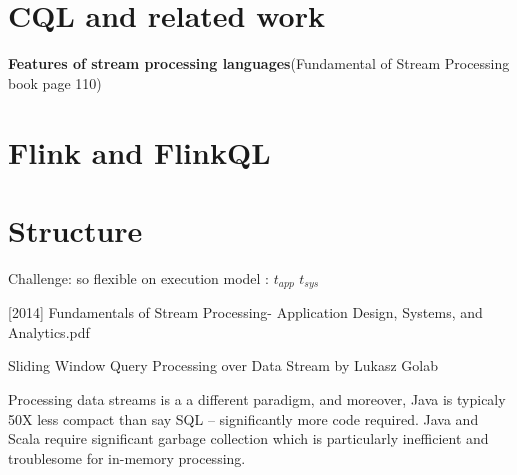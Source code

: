\section*{CQL and related work}
\textbf{Features of stream processing languages}(Fundamental of Stream Processing book page 110)


\section*{Flink and FlinkQL}
\section*{Structure}

Challenge: so flexible on execution model : $t_{app}$ $t_{sys}$



[2014] Fundamentals of Stream Processing- Application Design, Systems, and Analytics.pdf \citep{Henrique:2014}



Sliding Window Query Processing over Data Stream 
by
Lukasz Golab




 Processing data streams is a a different paradigm, and moreover, Java is typicaly 50X less compact than say SQL – significantly more code required. Java and Scala require significant garbage collection which is particularly inefficient and troublesome for in-memory processing.
 
 
 
 \href {http://www.sqlstream.com/blog/2015/03/5-reasons-why-spark-streamings-batch-processing-of-data-streams-is-not-stream-processing/}{}


